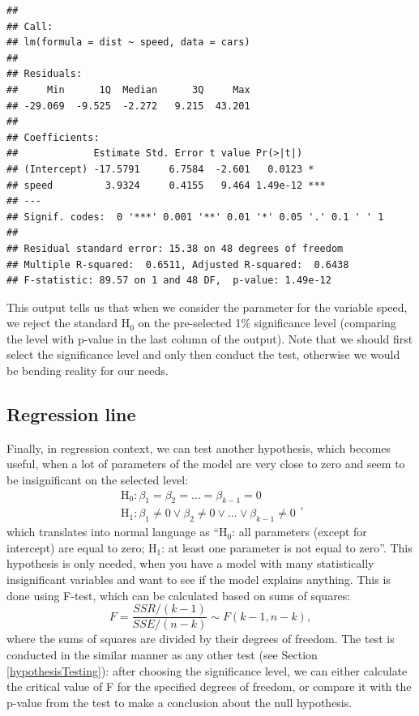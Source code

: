 \documentclass[
]{book}
\theoremstyle{definition}
\theoremstyle{definition}
\theoremstyle{definition}
\theoremstyle{definition}
\theoremstyle{remark}
\begin{document}
\begin{verbatim}
## 
## Call:
## lm(formula = dist ~ speed, data = cars)
## 
## Residuals:
##     Min      1Q  Median      3Q     Max 
## -29.069  -9.525  -2.272   9.215  43.201 
## 
## Coefficients:
##             Estimate Std. Error t value Pr(>|t|)    
## (Intercept) -17.5791     6.7584  -2.601   0.0123 *  
## speed         3.9324     0.4155   9.464 1.49e-12 ***
## ---
## Signif. codes:  0 '***' 0.001 '**' 0.01 '*' 0.05 '.' 0.1 ' ' 1
## 
## Residual standard error: 15.38 on 48 degrees of freedom
## Multiple R-squared:  0.6511, Adjusted R-squared:  0.6438 
## F-statistic: 89.57 on 1 and 48 DF,  p-value: 1.49e-12
\end{verbatim}

This output tells us that when we consider the parameter for the variable speed, we reject the standard H\(_0\) on the pre-selected 1\% significance level (comparing the level with p-value in the last column of the output). Note that we should first select the significance level and only then conduct the test, otherwise we would be bending reality for our needs.

\hypertarget{regression-line}{%
\subsection{Regression line}\label{regression-line}}

Finally, in regression context, we can test another hypothesis, which becomes useful, when a lot of parameters of the model are very close to zero and seem to be insignificant on the selected level:
\begin{equation}
    \begin{aligned}
        \mathrm{H}_0: \beta_1 = \beta_2 = \dots = \beta_{k-1} = 0 \\
        \mathrm{H}_1: \beta_1 \neq 0 \vee \beta_2 \neq 0 \vee \dots \vee \beta_{k-1} \neq 0
    \end{aligned} ,
    \label{eq:regressionHypothesis02}
\end{equation}
which translates into normal language as ``H\(_0\): all parameters (except for intercept) are equal to zero; H\(_1\): at least one parameter is not equal to zero''. This hypothesis is only needed, when you have a model with many statistically insignificant variables and want to see if the model explains anything. This is done using F-test, which can be calculated based on sums of squares:
\begin{equation*}
    F = \frac{ SSR / (k-1)}{SSE / (n-k)} \sim F(k-1, n-k) ,
\end{equation*}
where the sums of squares are divided by their degrees of freedom. The test is conducted in the similar manner as any other test (see Section \ref{hypothesisTesting}): after choosing the significance level, we can either calculate the critical value of F for the specified degrees of freedom, or compare it with the p-value from the test to make a conclusion about the null hypothesis.
\end{document}
